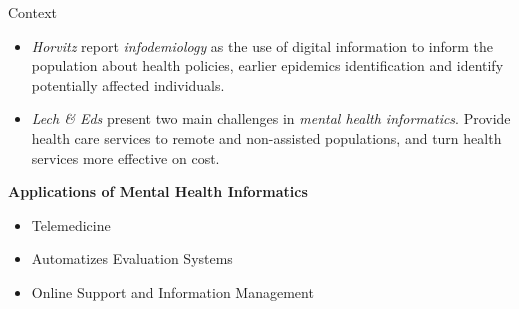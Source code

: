 \documentclass[aspectratio=169,10pt,xcolor={dvipsnames}]{beamer}
\begin{document}
\begin{frame}{Context}
  \begin{block}{}
    \begin{itemize}
      \item \textit{Horvitz} report \textit{infodemiology} as the use of digital information to inform the population about health policies, earlier epidemics identification and identify potentially affected individuals\cite{Horvitz}.
      \item \textit{Lech \& Eds} present two main challenges in \textit{mental health informatics}. Provide health care services to remote and non-assisted populations, and turn health services more effective on cost\cite{Lech2014}.      
    \end{itemize}
  \end{block}

  \begin{block}{\textbf{Applications of Mental Health Informatics}}
    \begin{itemize}
      \item Telemedicine
      \item Automatizes Evaluation Systems
      \item Online Support and Information Management
    \end{itemize}
  \end{block}
\end{frame}

    

\end{document}

